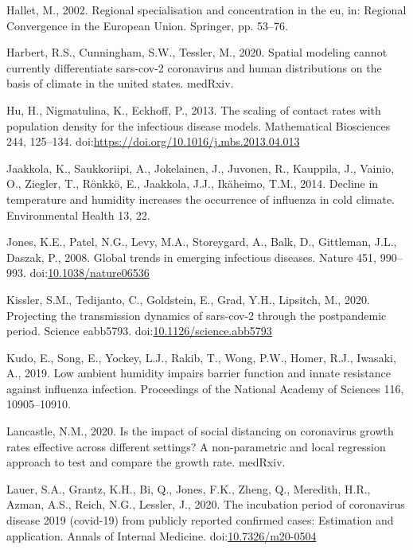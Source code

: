 \documentclass[]{elsarticle} %
\begin{document}
\leavevmode\hypertarget{ref-Hallet2002regional}{}%
Hallet, M., 2002. Regional specialisation and concentration in the eu,
in: Regional Convergence in the European Union. Springer, pp. 53--76.

\leavevmode\hypertarget{ref-Harbert2020spatial}{}%
Harbert, R.S., Cunningham, S.W., Tessler, M., 2020. Spatial modeling
cannot currently differentiate sars-cov-2 coronavirus and human
distributions on the basis of climate in the united states. medRxiv.

\leavevmode\hypertarget{ref-Hu2013scaling}{}%
Hu, H., Nigmatulina, K., Eckhoff, P., 2013. The scaling of contact rates
with population density for the infectious disease models. Mathematical
Biosciences 244, 125--134.
doi:\href{https://doi.org/https://doi.org/10.1016/j.mbs.2013.04.013}{https://doi.org/10.1016/j.mbs.2013.04.013}

\leavevmode\hypertarget{ref-Jaakkola2014decline}{}%
Jaakkola, K., Saukkoriipi, A., Jokelainen, J., Juvonen, R., Kauppila,
J., Vainio, O., Ziegler, T., Rönkkö, E., Jaakkola, J.J., Ikäheimo, T.M.,
2014. Decline in temperature and humidity increases the occurrence of
influenza in cold climate. Environmental Health 13, 22.

\leavevmode\hypertarget{ref-Jones2008global}{}%
Jones, K.E., Patel, N.G., Levy, M.A., Storeygard, A., Balk, D.,
Gittleman, J.L., Daszak, P., 2008. Global trends in emerging infectious
diseases. Nature 451, 990--993.
doi:\href{https://doi.org/10.1038/nature06536}{10.1038/nature06536}

\leavevmode\hypertarget{ref-Kissler2020projecting}{}%
Kissler, S.M., Tedijanto, C., Goldstein, E., Grad, Y.H., Lipsitch, M.,
2020. Projecting the transmission dynamics of sars-cov-2 through the
postpandemic period. Science eabb5793.
doi:\href{https://doi.org/10.1126/science.abb5793}{10.1126/science.abb5793}

\leavevmode\hypertarget{ref-Kudo2019low}{}%
Kudo, E., Song, E., Yockey, L.J., Rakib, T., Wong, P.W., Homer, R.J.,
Iwasaki, A., 2019. Low ambient humidity impairs barrier function and
innate resistance against influenza infection. Proceedings of the
National Academy of Sciences 116, 10905--10910.

\leavevmode\hypertarget{ref-Lancastle2020impact}{}%
Lancastle, N.M., 2020. Is the impact of social distancing on coronavirus
growth rates effective across different settings? A non-parametric and
local regression approach to test and compare the growth rate. medRxiv.

\leavevmode\hypertarget{ref-Lauer2020incubation}{}%
Lauer, S.A., Grantz, K.H., Bi, Q., Jones, F.K., Zheng, Q., Meredith,
H.R., Azman, A.S., Reich, N.G., Lessler, J., 2020. The incubation period
of coronavirus disease 2019 (covid-19) from publicly reported confirmed
cases: Estimation and application. Annals of Internal Medicine.
doi:\href{https://doi.org/10.7326/m20-0504}{10.7326/m20-0504}
\end{document}
